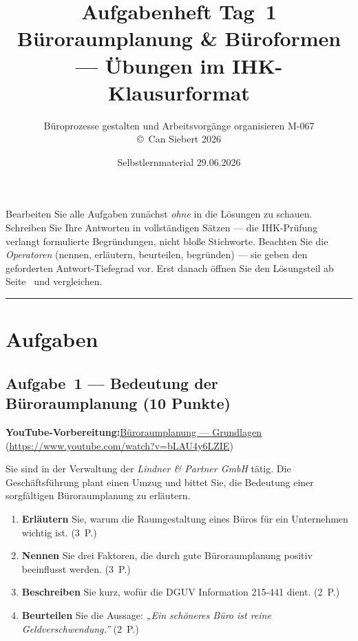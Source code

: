 \documentclass[11pt, a4paper]{article}
\title{\vspace*{-1.5cm}\Huge\bfseries\color{bfwPrimaryDark}Aufgabenheft Tag~1\\[0.4em]
  \large\color{bfwInkSoft}\textnormal{Büroraumplanung \& Büroformen --- Übungen im IHK-Klausurformat}}
\author{\textsf{Büroprozesse gestalten und Arbeitsvorgänge organisieren \textperiodcentered{} M-067}\\
\textsf{\small\copyright\ Can Siebert\,\textperiodcentered\,2026}}
\date{Selbstlernmaterial \textperiodcentered{} 29.06.2026}
\begin{document}
\maketitle
\thispagestyle{empty}

\begin{merksatz}[title={\bfseries So nutzen Sie dieses Aufgabenheft}]
Bearbeiten Sie alle Aufgaben zunächst \emph{ohne} in die Lösungen zu schauen. Schreiben
Sie Ihre Antworten in vollständigen Sätzen --- die IHK-Prüfung verlangt formulierte
Begründungen, nicht bloße Stichworte. Beachten Sie die \emph{Operatoren} (nennen,
erläutern, beurteilen, begründen) --- sie geben den geforderten Antwort-Tiefegrad vor.
Erst danach öffnen Sie den Lösungsteil ab Seite~\pageref{loesungen} und vergleichen.
\end{merksatz}

\tableofcontents
\vspace{1em}
\hrule

\section{Aufgaben}

\subsection*{Aufgabe~1 --- Bedeutung der Büroraumplanung (10 Punkte)}

\noindent\textbf{\color{bfwAccent}YouTube-Vorbereitung:}\enspace \href{https://www.youtube.com/watch?v=bLAU4y6LZIE}{Büroraumplanung --- Grundlagen} (\url{https://www.youtube.com/watch?v=bLAU4y6LZIE})

\medskip
Sie sind in der Verwaltung der \emph{Lindner \& Partner GmbH} tätig. Die Geschäfts\-führung
plant einen Umzug und bittet Sie, die Bedeutung einer sorgfältigen Büroraumplanung zu
erläutern.

\begin{enumerate}[label=(\alph*)]
  \item \textbf{Erläutern} Sie, warum die Raumgestaltung eines Büros für ein Unternehmen wichtig ist. \hfill (3~P.)
  \item \textbf{Nennen} Sie drei Faktoren, die durch gute Büroraumplanung positiv beeinflusst werden. \hfill (3~P.)
  \item \textbf{Beschreiben} Sie kurz, wofür die DGUV Information 215-441 dient. \hfill (2~P.)
  \item \textbf{Beurteilen} Sie die Aussage: \emph{„Ein schöneres Büro ist reine Geldverschwendung.”} \hfill (2~P.)
\end{enumerate}
\end{document}
